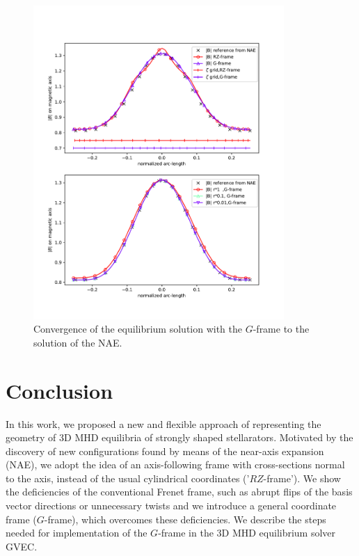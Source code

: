 \documentclass[12pt]{iopart}
\newcommand\hlchangedrev[1]{#1} %
\newcommand\GFF{$G$-frame}
\newcommand\RZF{$RZ$-frame}
\begin{document}
\begin{figure}[htbp!]
    \centering
    \includegraphics[width=0.85\textwidth,trim=20 50 30 370,clip]{pics/comparison_Bnorm__r_convergence_over_arclength.pdf}
    \caption{Convergence of the equilibrium solution with the \GFF{} to the solution of the NAE.} 
    \label{fig:convergence_NAE}  
\end{figure}

\section{Conclusion}
In this work, we proposed a new and flexible approach of representing the geometry of 3D MHD equilibria of strongly shaped stellarators. Motivated by the discovery of new configurations found by means of the near-axis expansion (NAE), we adopt the idea of an axis-following frame with cross-sections normal to the axis, instead of the usual cylindrical coordinates ('\RZF{}'). 
We show  the deficiencies of the conventional Frenet frame, such as abrupt \hlchangedrev{flips of the basis vector directions} or unnecessary twists and we introduce a \hlchangedrev{general coordinate} frame (\GFF{}),
which overcomes these deficiencies. We describe the steps needed for implementation of the \GFF{} in the 3D MHD equilibrium solver GVEC.
\end{document}
